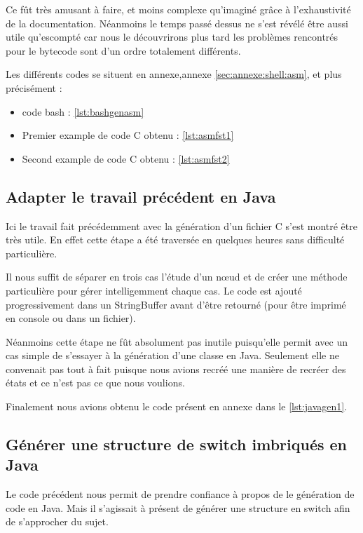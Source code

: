 Ce fût très amusant à faire, et moins complexe qu'imaginé grâce à l'exhaustivité de la documentation.
Néanmoins le temps passé dessus ne s'est révélé être aussi utile qu'escompté car nous le découvrirons
plus tard les problèmes rencontrés pour le bytecode sont d'un ordre totalement différents.\newline


Les différents codes se situent en annexe,annexe \autoref{sec:annexe:shell:asm}, et plus précisément :
\begin{itemize}
    \item code bash : \autoref{lst:bashgenasm}
    \item Premier example de code C obtenu : \autoref{lst:asmfst1}
    \item Second example de code C obtenu : \autoref{lst:asmfst2}
\end{itemize}

\newpage
\subsection{Adapter le travail précédent en Java}

Ici le travail fait précédemment avec la génération d'un fichier C s'est montré être très
utile. En effet cette étape a été traversée en quelques heures sans difficulté particulière.


Il nous suffit de séparer en trois cas l'étude d'un n\oe ud et de créer une méthode
particulière pour gérer intelligemment chaque cas. Le code est ajouté progressivement
dans un StringBuffer avant d'être retourné (pour être imprimé en console ou
dans un fichier).

Néanmoins cette étape ne fût absolument pas inutile puisqu'elle permit avec un cas simple
de s'essayer à la génération d'une classe en Java. Seulement elle ne convenait pas tout
à fait puisque nous avions recréé une manière de recréer des états et ce n'est pas
ce que nous voulions.

Finalement nous avions obtenu le code présent en annexe dans le \autoref{lst:javagen1}.

\subsection{Générer une structure de switch imbriqués en Java}

Le code précédent nous permit de prendre confiance à propos de le génération de code en Java.
Mais il s'agissait à présent de générer une structure en switch afin de s'approcher du
sujet.


